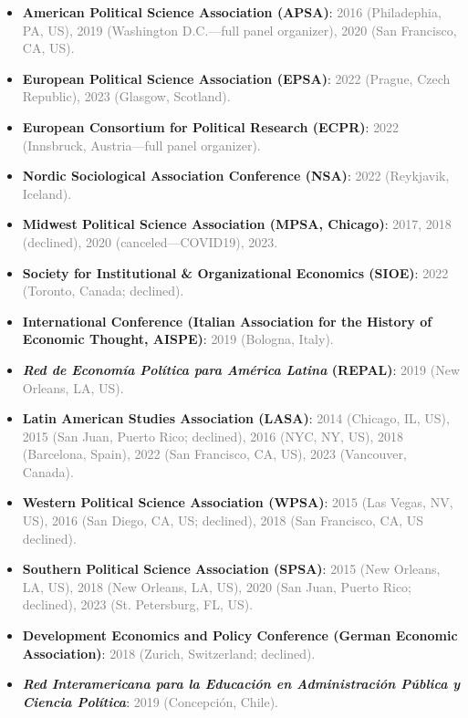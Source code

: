 \begin{itemize}
\item[\textcolor{gray}{\textbullet}] {\bf American Political Science Association (APSA)}: \textcolor{gray}{2016 (Philadephia, PA, US), 2019 (Washington D.C.---full panel organizer), 2020 (San Francisco, CA, US).}
\item[\textcolor{gray}{\textbullet}] {\bf European Political Science Association (EPSA)}: \textcolor{gray}{2022 (Prague, Czech Republic), 2023 (Glasgow, Scotland).}
\item[\textcolor{gray}{\textbullet}] {\bf European Consortium for Political Research (ECPR)}: \textcolor{gray}{2022 (Innsbruck, Austria---full panel organizer).}
\item[\textcolor{gray}{\textbullet}] {\bf Nordic Sociological Association Conference (NSA)}: \textcolor{gray}{2022 (Reykjavik, Iceland).}
\item[\textcolor{gray}{\textbullet}] {\bf Midwest Political Science Association (MPSA, Chicago)}: \textcolor{gray}{2017, 2018 (declined), 2020 (canceled---COVID19), 2023.}
\item[\textcolor{gray}{\textbullet}] {\bf Society for Institutional \& Organizational Economics (SIOE)}: \textcolor{gray}{2022 (Toronto, Canada; declined).}
\item[\textcolor{gray}{\textbullet}] {\bf International Conference (Italian Association for the History of Economic Thought, AISPE)}: \textcolor{gray}{2019 (Bologna, Italy).}
\item[\textcolor{gray}{\textbullet}] {\bf \emph{Red de Econom\'ia Pol\'itica para Am\'erica Latina} (REPAL)}: \textcolor{gray}{2019 (New Orleans, LA, US).}
\item[\textcolor{gray}{\textbullet}] {\bf Latin American Studies Association (LASA)}: \textcolor{gray}{2014 (Chicago, IL, US), 2015 (San Juan, Puerto Rico; declined), 2016 (NYC, NY, US), 2018 (Barcelona, Spain), 2022 (San Francisco, CA, US), 2023 (Vancouver, Canada).}
\item[\textcolor{gray}{\textbullet}] {\bf Western Political Science Association (WPSA)}: \textcolor{gray}{2015 (Las Vegas, NV, US), 2016 (San Diego, CA, US; declined), 2018 (San Francisco, CA, US declined).}
\item[\textcolor{gray}{\textbullet}] {\bf Southern Political Science Association (SPSA)}: \textcolor{gray}{2015 (New Orleans, LA, US), 2018 (New Orleans, LA, US), 2020 (San Juan, Puerto Rico; declined), 2023 (St. Petersburg, FL, US).}
\item[\textcolor{gray}{\textbullet}] {\bf Development Economics and Policy Conference (German Economic Association)}: \textcolor{gray}{2018 (Zurich, Switzerland; declined).}
\item[\textcolor{gray}{\textbullet}] {\bf \emph{Red Interamericana para la Educaci\'on en Administraci\'on P\'ublica y Ciencia Pol\'itica}}: \textcolor{gray}{2019 (Concepci\'on, Chile).}
\end{itemize}

